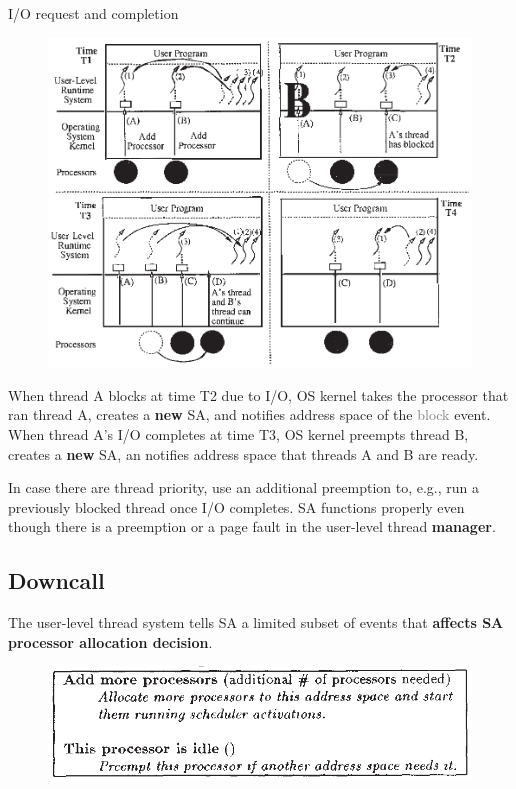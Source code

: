 \begin{example}
I/O request and completion

\begin{figure}[H]
\centering
\includegraphics[width=1\linewidth]{figures/sa.eps}
\end{figure}

When thread A blocks at time T2 due to I/O, OS kernel takes the processor that ran thread A, creates a \textbf{new} SA, and notifies address space of the \textcolor{gray}{block} event. \\

When thread A's I/O completes at time T3, OS kernel preempts thread B, creates a \textbf{new} SA, an notifies address space that threads A and B are ready.
\end{example}

In case there are thread priority, use an additional preemption to, e.g., run a previously blocked thread once I/O completes. SA functions properly even though there is a preemption or a page fault in the user-level thread \textbf{manager}.

\subsection{Downcall}

The user-level thread system tells SA a limited subset of events that \textbf{affects SA processor allocation decision}.

\begin{figure}[H]
\centering
\includegraphics[width=0.7\linewidth]{figures/downcall.eps}
\end{figure}


